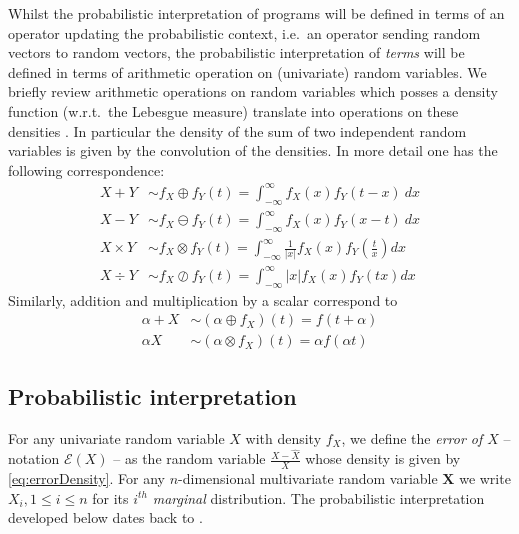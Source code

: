 \documentclass[10pt,conference]{IEEEtran}
\newcommand{\ie}{i.e.\ }
\newcommand{\wrt}{w.r.t.\ }
\newcommand{\Err}{\mathcal{E}}
\newcommand{\absv}[1]{\vert #1\vert}
\begin{document}
Whilst the probabilistic interpretation of programs will be defined in terms of an operator updating the probabilistic context, \ie an operator sending random vectors to random vectors, the probabilistic interpretation of \emph{terms} will be defined in terms of arithmetic operation on (univariate) random variables. We briefly review arithmetic operations on random variables which posses a density function (\wrt the Lebesgue measure) translate into operations on these densities \cite{springer1979algebra}. In particular the density of the sum of two independent random variables is given by the convolution of the densities. In more detail one has the following correspondence:
\begin{align}
X+Y&\sim f_X\oplus f_Y(t)=\int_{-\infty}^{\infty} f_X(x)f_Y(t-x)~dx\label{eq:pdfplus}\\
X-Y&\sim f_X\ominus f_Y(t)=\int_{-\infty}^{\infty} f_X(x)f_Y(x-t)~dx\label{eq:pdfminus}\\
X\times Y&\sim f_X\otimes f_Y(t)=\int_{-\infty}^{\infty} \frac{1}{\absv{x}}f_X(x)f_Y\left(\frac{t}{x}\right)dx\label{eq:pdftimes}\\
X\div Y&\sim f_X\oslash f_Y(t)=\int_{-\infty}^{\infty} \absv{x}f_X(x)f_Y(tx)dx\label{eq:pdfdiv}
\end{align}
Similarly, addition and multiplication by a scalar correspond to
\begin{align*}
\alpha+X&\sim (\alpha\oplus f_X)(t)=f(t+\alpha)\\
\alpha X&\sim (\alpha\otimes f_X)(t)=\alpha f(\alpha t)
\end{align*}

\subsection{Probabilistic interpretation}\label{subsec:sem}

For any univariate random variable $X$ with density $f_X$, we define the \emph{error of $X$} -- notation $\Err(X)$ -- as the random variable $\frac{X-\widehat{X}}{X}$ whose density is given by \cref{eq:errorDensity}. For any $n$-dimensional multivariate random variable $\mathbf{X}$ we write $X_i, 1\leq i\leq n$ for its $i^{th}$ \emph{marginal} distribution. The probabilistic interpretation developed below dates back to  \cite{K81c}.
\end{document}
